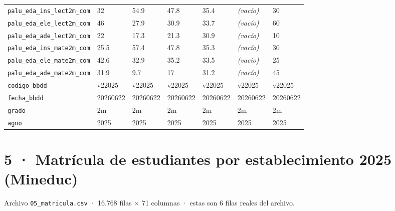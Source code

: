\documentclass[10pt]{article}
\begin{document}
\begin{xltabular}{\linewidth}{@{}p{4.3cm} Y Y Y Y Y Y @{}}
\texttt{palu\_\allowbreak{}eda\_\allowbreak{}ins\_\allowbreak{}lect2m\_\allowbreak{}com} & 32 & 54.9 & 47.8 & 35.4 & \textit{\color{gris}(vacío)} & 30 \\
\texttt{palu\_\allowbreak{}eda\_\allowbreak{}ele\_\allowbreak{}lect2m\_\allowbreak{}com} & 46 & 27.9 & 30.9 & 33.7 & \textit{\color{gris}(vacío)} & 60 \\
\texttt{palu\_\allowbreak{}eda\_\allowbreak{}ade\_\allowbreak{}lect2m\_\allowbreak{}com} & 22 & 17.3 & 21.3 & 30.9 & \textit{\color{gris}(vacío)} & 10 \\
\texttt{palu\_\allowbreak{}eda\_\allowbreak{}ins\_\allowbreak{}mate2m\_\allowbreak{}com} & 25.5 & 57.4 & 47.8 & 35.3 & \textit{\color{gris}(vacío)} & 30 \\
\texttt{palu\_\allowbreak{}eda\_\allowbreak{}ele\_\allowbreak{}mate2m\_\allowbreak{}com} & 42.6 & 32.9 & 35.2 & 33.5 & \textit{\color{gris}(vacío)} & 25 \\
\texttt{palu\_\allowbreak{}eda\_\allowbreak{}ade\_\allowbreak{}mate2m\_\allowbreak{}com} & 31.9 & 9.7 & 17 & 31.2 & \textit{\color{gris}(vacío)} & 45 \\
\texttt{codigo\_\allowbreak{}bbdd} & v22025 & v22025 & v22025 & v22025 & v22025 & v22025 \\
\texttt{fecha\_\allowbreak{}bbdd} & 20260622 & 20260622 & 20260622 & 20260622 & 20260622 & 20260622 \\
\texttt{grado} & 2m & 2m & 2m & 2m & 2m & 2m \\
\texttt{agno} & 2025 & 2025 & 2025 & 2025 & 2025 & 2025 \\
\end{xltabular}
\normalsize

\clearpage
\hypertarget{base5}{}
\section{5 · Matrícula de estudiantes por establecimiento 2025 (Mineduc)}
\small Archivo \texttt{05\_matricula.csv} · 16.768 filas × 71 columnas · estas son 6 filas reales del archivo.\normalsize
\end{document}
